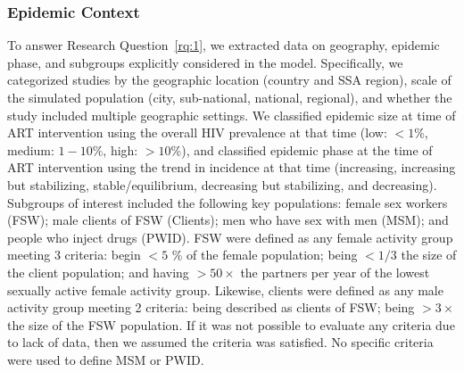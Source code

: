 \subsubsection{Epidemic Context}
\label{sss:meth:context}
To answer Research Question~\ref{rq:1}, we extracted data on
geography, epidemic phase, and subgroups explicitly considered in the model.
Specifically, we categorized studies by the geographic location (country and SSA region),
scale of the simulated population (city, sub-national, national, regional), and
whether the study included multiple geographic settings.
We classified epidemic size at time of ART intervention using
the overall HIV prevalence at that time (low: $<1\%$, medium: $1-10\%$, high: $>10\%$),
and classified epidemic phase at the time of ART intervention
using the trend in incidence at that time
(increasing, increasing but stabilizing, stable/equilibrium, decreasing but stabilizing, and decreasing).
Subgroups of interest included the following key populations:
female sex workers (FSW);
male clients of FSW (Clients);
men who have sex with men (MSM); and
people who inject drugs (PWID).
FSW were defined as any female activity group meeting 3 criteria:
begin ${<5}$ \% of the female population;
being ${<1/3}$ the size of the client population; and
having ${>50\times}$ the partners per year of
the lowest sexually active female activity group.
Likewise, clients were defined as any male activity group meeting 2 criteria:
being described as clients of FSW;
being ${>3\times}$ the size of the FSW population.
If it was not possible to evaluate any criteria due to lack of data,
then we assumed the criteria was satisfied.
No specific criteria were used to define MSM or PWID.
